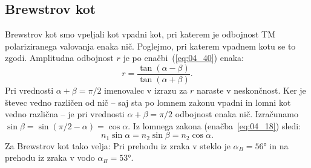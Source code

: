 \subsection*{Brewstrov kot}
Brewstrov kot smo vpeljali kot vpadni kot, pri katerem je odbojnost
TM polariziranega valovanja enaka nič. Poglejmo, pri katerem
vpadnem kotu se to zgodi. Amplitudna odbojnost $r$ je po enačbi~(\ref{eq:04_40})
enaka:
\begin{equation}
r = \frac{\tan(\alpha-\beta)}{\tan(\alpha+\beta)}.
\label{eq:04_50}
\end{equation}
Pri vrednosti $\alpha + \beta = \pi/2$ imenovalec v izrazu za $r$ 
naraste v neskončnost. Ker je števec vedno različen od nič -- saj
sta po lomnem zakonu vpadni in lomni kot vedno različna -- je pri 
vrednosti $\alpha + \beta = \pi/2$ odbojnost enaka nič.
Izračunamo $\sin \beta = \sin (\pi/2-\alpha) = \cos \alpha$. 
Iz lomnega zakona (enačba~\ref{eq:04_18}) sledi:
\begin{equation}
n_1 \sin \alpha= n_2 \sin \beta= n_2 \cos \alpha.
\label{eq:04_51}
\end{equation}
Za Brewstrov kot tako velja:
Pri prehodu iz zraka v steklo je $\alpha_B = 56\si{\degree}$ in na prehodu
iz zraka v vodo $\alpha_B = 53\si{\degree}$. 

